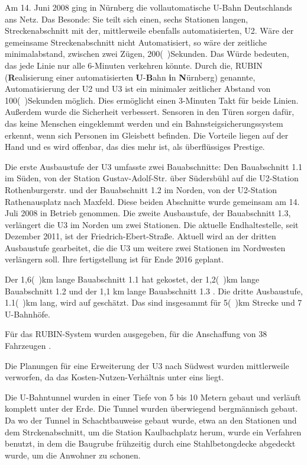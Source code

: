Am 14. Juni 2008 ging in Nürnberg die vollautomatische U-Bahn Deutschlands ans Netz\cite{nbBr}. Das Besonde: Sie teilt sich einen, sechs Stationen langen, Streckenabschnitt mit der, mittlerweile ebenfalls automatisierten, U2. Wäre der gemeinsame Streckenabschnitt nicht Automatisiert, so wäre der zeitliche minimalabstand, zwischen zwei Zügen, 200(\ )Sekunden\cite{nbBr}. Das Würde bedeuten, das jede Linie nur alle 6-Minuten verkehren könnte. Durch die, RUBIN ({\bf R}ealisierung einer automatisierten {\bf U}-{\bf B}ahn {\bf i}n {\bf N}ürnberg) genannte, Automatisierung der U2 und U3 ist ein minimaler zeitlicher Abstand von 100(\ )Sekunden möglich. Dies ermöglicht einen 3-Minuten Takt für beide Linien. Außerdem wurde die Sicherheit verbessert. Sensoren in den Türen sorgen dafür, das keine Menschen eingeklemmt werden und ein Bahnsteigsicherungssystem erkennt, wenn sich Personen im Gleisbett befinden\cite{nbBr}. Die Vorteile liegen auf der Hand und es wird offenbar, das dies mehr ist, als überflüssiges Prestige. 

Die erste Ausbaustufe der U3 umfasste zwei Bauabschnitte: Den Bauabschnitt 1.1 im Süden, von der Station Gustav-Adolf-Str. über Südersbühl auf die U2-Station Rothenburgerstr. und der Bauabschnitt 1.2 im Norden, von der U2-Station Rathenausplatz nach Maxfeld. Diese beiden Abschnitte wurde gemeinsam am 14. Juli 2008 in Betrieb genommen. Die zweite Ausbaustufe, der Bauabschnitt 1.3, verlängert die U3 im Norden um zwei Stationen. Die aktuelle Endhaltestelle, seit Dezember 2011, ist der Friedrich-Ebert-Straße. Aktuell wird an der dritten Ausbaustufe gearbeitet, die die U3 um weitere zwei Stationen im Nordwesten verlängern soll. Ihre fertigstellung ist für Ende 2016 geplant\cite{nbNord3}.

Der 1,6(\ )km lange Bauabschnitt 1.1 hat  gekostet, der 1,2(\ )km lange Bauabschnitt 1.2  und der 1,1 km lange Bauabschnitt 1.3 \cite{nbBr}. Die dritte Ausbaustufe, 1.1(\ )km lang, wird auf  geschätzt\cite{nbNord3}. Das sind insgesammt  für 5(\ )km Strecke und 7 U-Bahnhöfe. 

Für das RUBIN-System wurden  ausgegeben, für die Anschaffung von 38 Fahrzeugen \cite{nSi}.

Die Planungen für eine Erweiterung der U3 nach Südwest wurden mittlerweile verworfen, da das Kosten-Nutzen-Verhältnis unter eins liegt.

Die U-Bahntunnel wurden in einer Tiefe von 5 bis 10 Metern gebaut und verläuft komplett unter der Erde\cite{nbRef3}. Die Tunnel wurden überwiegend bergmännisch gebaut. Da wo der Tunnel in Schachtbauweise gebaut wurde, etwa an den Stationen und dem Strckenabschnitt, um die Station Kaulbachplatz herum, wurde ein Verfahren benutzt, in dem die Baugrube frühzeitig durch eine Stahlbetongdecke abgedeckt wurde, um die Anwohner zu schonen\cite{nbBr}. 

